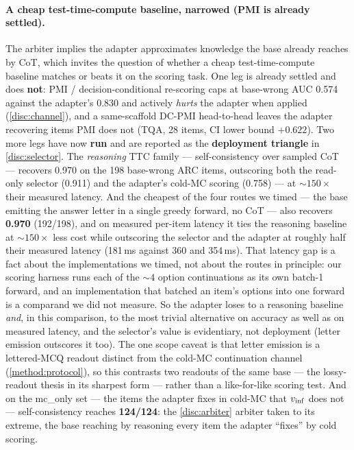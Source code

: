 \paragraph{A cheap test-time-compute baseline, narrowed (PMI is already settled).}
The arbiter implies the adapter approximates knowledge the base already reaches by
CoT, which invites the question of whether a cheap test-time-compute baseline
matches or beats it on the scoring task. One leg is already settled and does
\textbf{not}: PMI / decision-conditional re-scoring caps at base-wrong AUC
0.574 against the adapter's 0.830 and actively \emph{hurts} the adapter when
applied (\cref{disc:channel}), and a same-scaffold DC-PMI head-to-head leaves the
adapter recovering items PMI does not (TQA, 28 items, CI lower bound $+0.622$). Two
more legs have now \textbf{run} and are reported as the \textbf{deployment
triangle} in \cref{disc:selector}. The \emph{reasoning} TTC family ---
self-consistency over sampled CoT --- recovers 0.970 on the 198 base-wrong ARC
items, outscoring both the read-only selector (0.911) and the adapter's cold-MC
scoring (0.758) --- at ${\sim}150\times$ their measured latency. And the cheapest of the four routes we timed --- the base emitting the answer
letter in a single greedy forward, no CoT --- also recovers \textbf{0.970}
(192/198), and on measured per-item latency it ties the reasoning baseline at
${\sim}150\times$ less cost while outscoring the selector and the
adapter at roughly half their measured latency (181\,ms against 360 and 354\,ms).
That latency gap is a fact about the implementations we timed, not about the routes
in principle: our scoring harness runs each of the ${\sim}4$ option continuations as
its own batch-1 forward, and an implementation that batched an item's options into
one forward is a comparand we did not measure. So the adapter loses to a reasoning
baseline \emph{and}, in this comparison, to the most trivial alternative on accuracy
as well as on measured latency, and the selector's
value is evidentiary, not deployment (letter emission outscores it too). The one scope caveat is that letter emission
is a lettered-MCQ readout distinct from the cold-MC continuation channel
(\cref{method:protocol}), so this contrasts two readouts of the same base --- the
lossy-readout thesis in its sharpest form --- rather than a like-for-like scoring
test. And on the mc\_only set --- the items the adapter fixes in cold-MC that
$v_{\mathrm{inf}}$ does not --- self-consistency reaches \textbf{124/124}: the
\cref{disc:arbiter} arbiter taken to its extreme, the base reaching by reasoning
every item the adapter ``fixes'' by cold scoring.


